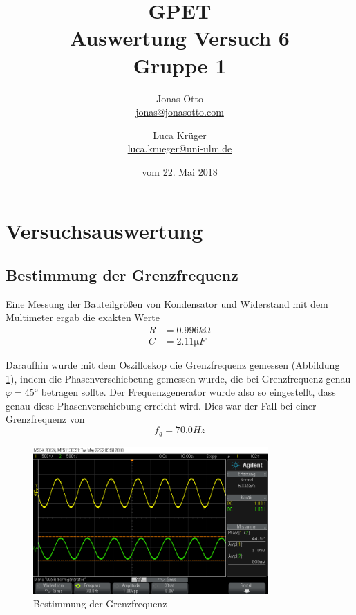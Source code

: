 \documentclass[a4paper]{article}
\title{GPET\\ Auswertung Versuch 6\\ Gruppe 1}
\author{Jonas Otto\\ \href{mailto:jonas@jonasotto.com}{jonas@jonasotto.com} 
   \and Luca Krüger \\ \href{mailto:luca.krueger@uni-ulm.de}{luca.krueger@uni-ulm.de} }
\date{vom   22. Mai 2018}
\begin{document}
    
\maketitle
\newpage
\section{Versuchsauswertung}

\subsection{Bestimmung der Grenzfrequenz}

Eine Messung der Bauteilgrößen von Kondensator und Widerstand mit dem Multimeter ergab die exakten Werte
\begin{equation*}
    \begin{split}
    R &= 0.996\si{k\ohm}\\
    C &= 2.11\si{\micro F}
\end{split}
\end{equation*}

Daraufhin wurde mit dem Oszilloskop die Grenzfrequenz gemessen (Abbildung \ref{fig:1-2-grenzfrequenz}), indem die Phasenverschiebeung gemessen wurde, die bei Grenzfrequenz genau $\varphi = \ang{45}$ betragen sollte. Der Frequenzgenerator wurde also so eingestellt, dass genau diese Phasenverschiebung erreicht wird. Dies war der Fall bei einer Grenzfrequenz von 
\begin{equation*}
    f_g=70.0\si{Hz}
\end{equation*}

\begin{figure}[H]
    \centering
    \includegraphics[width=0.8\textwidth]{versuch1/grenzfrequenz.png}
    \caption{Bestimmung der Grenzfrequenz}
    \label{fig:1-2-grenzfrequenz}
\end{figure}
\end{document}
